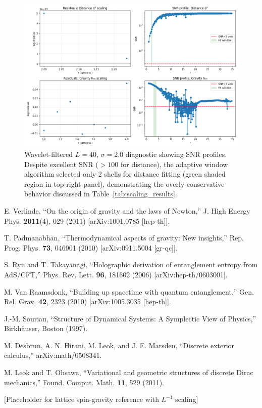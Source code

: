 \documentclass[prd,twocolumn,showpacs,superscriptaddress]{revtex4-2}
\begin{document}
	
	\begin{figure}[ht]
		\centering
		\includegraphics[width=0.9\columnwidth]{filtered_egravity_diagnostics_L40_sigma2.0_20250729_152042.png}
		\caption{Wavelet-filtered $L = 40$, $\sigma = 2.0$ diagnostic showing SNR profiles. Despite excellent SNR ($>100$ for distance), the adaptive window algorithm selected only 2 shells for distance fitting (green shaded region in top-right panel), demonstrating the overly conservative behavior discussed in Table~\ref{tab:scaling_results}.}
		\label{fig:diagnostic_filtered}
	\end{figure}
	
	\begin{thebibliography}{99}
		E. Verlinde, 
		``On the origin of gravity and the laws of Newton,''
		J. High Energy Phys. \textbf{2011}(4), 029 (2011)
		[arXiv:1001.0785 [hep-th]].
		
		T. Padmanabhan,
		``Thermodynamical aspects of gravity: New insights,''
		Rep. Prog. Phys. \textbf{73}, 046901 (2010)
		[arXiv:0911.5004 [gr-qc]].
		
		S. Ryu and T. Takayanagi,
		``Holographic derivation of entanglement entropy from AdS/CFT,''
		Phys. Rev. Lett. \textbf{96}, 181602 (2006)
		[arXiv:hep-th/0603001].
		
		M. Van Raamsdonk,
		``Building up spacetime with quantum entanglement,''
		Gen. Rel. Grav. \textbf{42}, 2323 (2010)
		[arXiv:1005.3035 [hep-th]].
		
		J.-M. Souriau,
		``Structure of Dynamical Systems: A Symplectic View of Physics,''
		Birkh\"auser, Boston (1997).
		
		M. Desbrun, A. N. Hirani, M. Leok, and J. E. Marsden,
		``Discrete exterior calculus,''
		arXiv:math/0508341.
		
		M. Leok and T. Ohsawa,
		``Variational and geometric structures of discrete Dirac mechanics,''
		Found. Comput. Math. \textbf{11}, 529 (2011).
		
		[Placeholder for lattice spin-gravity reference with $L^{-1}$ scaling]
		
	\end{thebibliography}
	
\end{document}
